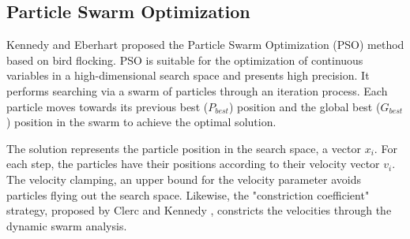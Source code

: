 \documentclass[runningheads]{llncs}
\begin{document}
\subsection{Particle Swarm Optimization}
Kennedy and Eberhart \cite{kennedy1999particle} proposed the Particle Swarm Optimization (PSO) method based on bird flocking. PSO is suitable for the optimization of continuous variables in a high-dimensional search space and presents high precision. It performs searching via a swarm of particles through an iteration process. Each particle moves towards its previous best (\(P_{best}\)) position and the global best (\(G_{best}\)) position in the swarm to achieve the optimal solution.


The solution represents the particle position in the search space, a vector $x_i$. For each step, the particles have their positions according to their velocity vector $v_i$. The velocity clamping, an upper bound for the velocity parameter avoids particles flying out the search space. Likewise, the "constriction coefficient" strategy, proposed by Clerc and Kennedy \cite{clerc2002particle}, constricts the velocities through the dynamic swarm analysis.



\end{document}
